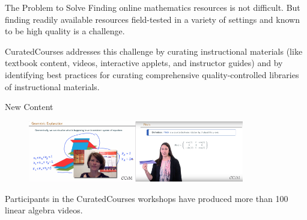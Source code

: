 \begin{sectionblock}{The Problem to Solve}
  Finding online mathematics resources is not difficult.
  But finding readily available resources field-tested in a variety of
  settings and known to be high quality is a challenge.

  \vspace{1ex}CuratedCourses addresses this challenge by curating
  instructional materials (like textbook content, videos, interactive
  applets, and instructor guides) and by identifying best practices
  for curating comprehensive quality-controlled libraries of
  instructional materials.
  
\end{sectionblock}

\vspace{1ex}

\begin{sectionblock}{New Content}
  
\begin{figure}\null\hfill\includegraphics[width=0.42\textwidth]{petra.png}\hfill\includegraphics[width=0.42\textwidth]{sarah.png}\hfill\null\end{figure}
Participants in the CuratedCourses workshops have produced more than
100 linear algebra videos.
  
\end{sectionblock}





